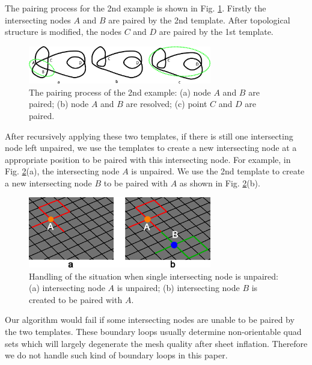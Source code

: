 \documentclass[final,5p,times,twocolumn]{elsarticle}
\begin{document}
The pairing process for the 2nd example is shown in Fig. \ref{fig:pair_int_exam2_proc}. Firstly the intersecting nodes $A$ and $B$ are paired by the 2nd template. After topological structure is modified, the nodes $C$ and $D$ are paired by the 1st template.

\begin{figure}[htbp]
\begin{center}
\includegraphics[width=8cm]{figures/pmexam2step.png}
\caption{The pairing process of the 2nd example: (a) node $A$ and $B$ are paired; (b) node $A$ and $B$ are resolved; (c) point $C$ and $D$ are paired.}
\label{fig:pair_int_exam2_proc}
\end{center}
\end{figure}

After recursively applying these two templates, if there is still one intersecting node left unpaired, we use the templates to create a new intersecting node at a appropriate position to be paired with this intersecting node. For example, in Fig. \ref{fig:one_int_pt_left}(a), the intersecting node $A$ is unpaired. We use the 2nd template to create a new intersecting node $B$ to be paired with $A$ as shown in Fig. \ref{fig:one_int_pt_left}(b).

\begin{figure}[htbp]
\begin{center}
\includegraphics[width=8cm]{figures/one_int_pt_left.png}
\caption{Handling of the situation when single intersecting node is unpaired: (a) intersecting node $A$ is unpaired; (b) intersecting node $B$ is created to be paired with $A$.}
\label{fig:one_int_pt_left}
\end{center}
\end{figure}

Our algorithm would fail if some intersecting nodes are unable to be paired by the two templates. These boundary loops usually determine non-orientable quad sets\cite{Suzuki:2010hn} which will largely degenerate the mesh quality after sheet inflation. Therefore we do not handle such kind of boundary loops in this paper.
\end{document}
